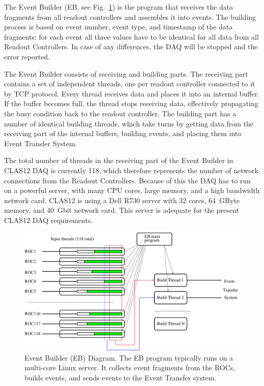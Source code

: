 The Event Builder (EB, see Fig.~\ref{fig:eb_diagram}) is the program that receives the data fragments from all readout controllers and assembles it into events. The building process is based on event number, event type, and timestamp of the data fragments: for each event all three values have to be identical for all data from all Readout Controllers. In case of any differences, the DAQ will be stopped and the error reported.

The Event Builder consists of receiving and building parts. The receiving part contains a set of independent threads, one per readout controller connected to it by TCP protocol. Every thread receives data and places it into an internal buffer. If the buffer becomes full, the thread stops receiving data, effectively propagating the busy condition back to the readout controller. The building part has a number of identical building threads, which take turns by getting data from the receiving part of the internal buffers, building events, and placing them into Event Transfer System.

The total number of threads in the receiving part of the Event Builder in CLAS12 DAQ is currently 118, which therefore represents the number of network connections from the Readout Controllers. Because of this the DAQ has to run on a powerful server, with many CPU cores, large memory, and a high bandwidth network card. CLAS12 is using a Dell R730 server with 32 cores, 64~GByte memory, and 40~Gbit network card. This server is adequate for the present CLAS12 DAQ requirements.

\begin{figure}[hbt]
	\centering
	\includegraphics[width=1.0\columnwidth,keepaspectratio]{img/eb_diagram.pdf}
	\caption{Event Builder (EB) Diagram. The EB program typically runs on a multi-core Linux server. It collects event fragments from the ROCs, builds events, and sends events to the Event Transfer system.}
	\label{fig:eb_diagram}
\end{figure}


